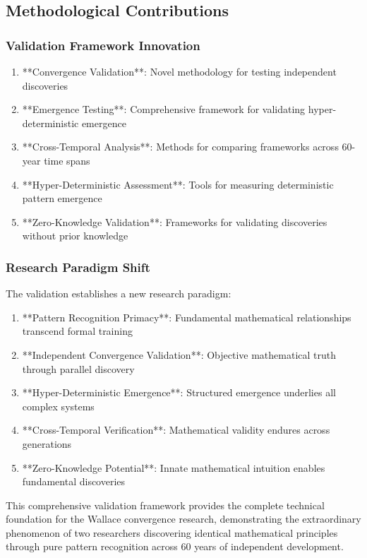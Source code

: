 \subsection{Methodological Contributions}

\subsubsection{Validation Framework Innovation}

\begin{enumerate}
    \item **Convergence Validation**: Novel methodology for testing independent discoveries
    \item **Emergence Testing**: Comprehensive framework for validating hyper-deterministic emergence
    \item **Cross-Temporal Analysis**: Methods for comparing frameworks across 60-year time spans
    \item **Hyper-Deterministic Assessment**: Tools for measuring deterministic pattern emergence
    \item **Zero-Knowledge Validation**: Frameworks for validating discoveries without prior knowledge
\end{enumerate}

\subsubsection{Research Paradigm Shift}

The validation establishes a new research paradigm:

\begin{enumerate}
    \item **Pattern Recognition Primacy**: Fundamental mathematical relationships transcend formal training
    \item **Independent Convergence Validation**: Objective mathematical truth through parallel discovery
    \item **Hyper-Deterministic Emergence**: Structured emergence underlies all complex systems
    \item **Cross-Temporal Verification**: Mathematical validity endures across generations
    \item **Zero-Knowledge Potential**: Innate mathematical intuition enables fundamental discoveries
\end{enumerate}

This comprehensive validation framework provides the complete technical foundation for the Wallace convergence research, demonstrating the extraordinary phenomenon of two researchers discovering identical mathematical principles through pure pattern recognition across 60 years of independent development.
